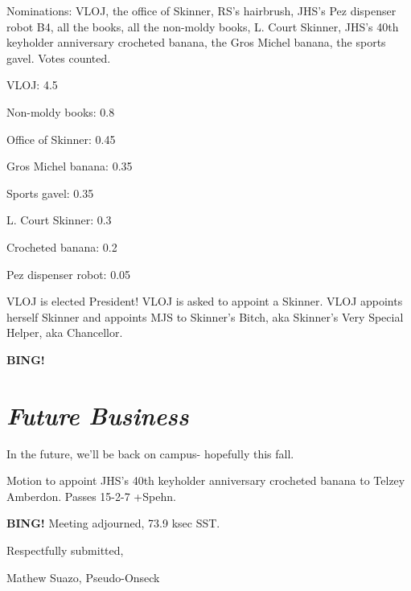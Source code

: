 \documentclass[10pt]{article}
\newcommand{\bing}{{\bf BING!} }
\newcommand{\goto}[1]{\bing \vskip 12pt \section*{{\em{#1}}}}
\newcommand{\onseck}{Mathew Suazo, Pseudo-Onseck\xspace}
\begin{document}
Nominations: VLOJ, the office of Skinner, RS's hairbrush, JHS's Pez dispenser robot B4, all the books, all the non-moldy books, L. Court Skinner, JHS's 40th keyholder anniversary crocheted banana, the Gros Michel banana, the sports gavel. Votes counted.

VLOJ: 4.5

Non-moldy books: 0.8

Office of Skinner: 0.45

Gros Michel banana: 0.35

Sports gavel: 0.35

L. Court Skinner: 0.3

Crocheted banana: 0.2

Pez dispenser robot: 0.05

VLOJ is elected President! VLOJ is asked to appoint a Skinner. VLOJ appoints herself Skinner and appoints MJS to Skinner's Bitch, aka Skinner's Very Special Helper, aka Chancellor.

\goto{Future Business}

In the future, we'll be back on campus- hopefully this fall.

Motion to appoint JHS's 40th keyholder anniversary crocheted banana to Telzey Amberdon. Passes 15-2-7 +Spehn.

\bing
\noindent
Meeting adjourned, 73.9 ksec SST.

\vspace{18pt}

\centerline{Respectfully submitted,}
\centerline{\onseck}
\end{document}
